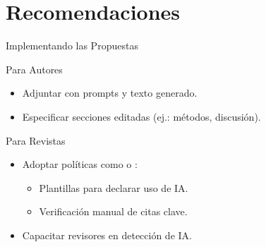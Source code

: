 \section{Recomendaciones}
\begin{frame}{Implementando las Propuestas}
    \begin{boxA}{Para Autores}
        \begin{itemize}
            \item Adjuntar  con prompts y texto generado.
            \item Especificar secciones editadas (ej.: métodos, discusión).
        \end{itemize}
    \end{boxA}

    \begin{boxA}{Para Revistas}
        \begin{itemize}
            \item Adoptar políticas como  o :
                  \begin{itemize}
                      \item Plantillas para declarar uso de IA.
                      \item Verificación manual de citas clave.
                  \end{itemize}
            \item Capacitar revisores en detección de IA.
        \end{itemize}
    \end{boxA}
\end{frame}

